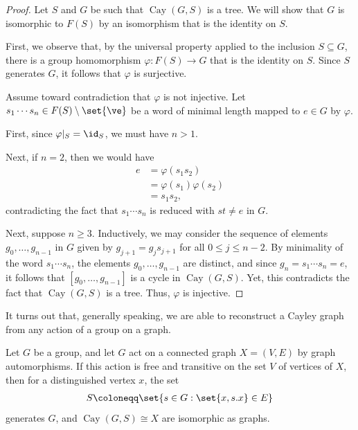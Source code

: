 \documentclass[10pt]{mypackage}
\renewcommand{\coloneq}{\coloneqq}
\begin{document}
\begin{proof}
  Let $S$ and $G$ be such that $\operatorname{Cay}\left( G,S \right)$ is a tree. We will show that $G$ is isomorphic to $F(S)$ by an isomorphism that is the identity on $S$.

  First, we observe that, by the universal property applied to the inclusion $S\subseteq G$, there is a group homomorphism $\varphi\colon F(S)\rightarrow G$ that is the identity on $S$. Since $S$ generates $G$, it follows that $\varphi$ is surjective.

  Assume toward contradiction that $\varphi$ is not injective. Let $s_1\cdots s_n\in F(S)\setminus \set{\ve}$ be a word of minimal length mapped to $e\in G$ by $\varphi$.

  First, since $\varphi|_{S} = \id_S$, we must have $n > 1$.

  Next, if $n = 2$, then we would have
  \begin{align*}
    e &= \varphi\left( s_1s_2 \right)\\
      &= \varphi\left( s_1 \right)\varphi\left( s_2 \right)\\
      &= s_1s_2,
  \end{align*}
  contradicting the fact that $s_1\cdots s_n$ is reduced with $st\neq e$ in $G$.

  Next, suppose $n\geq 3$. Inductively, we may consider the sequence of elements $g_0,\dots,g_{n-1}$ in $G$ given by $g_{j+1} = g_js_{j+1}$ for all $0\leq j \leq n-2$. By minimality of the word $s_1\cdots s_n$, the elements $g_0,\dots,g_{n-1}$ are distinct, and since $g_n = s_1\cdots s_n = e$, it follows that $\left[ g_0,\dots,g_{n-1} \right]$ is a cycle in $\operatorname{Cay}\left( G,S \right)$. Yet, this contradicts the fact that $\operatorname{Cay}\left( G,S \right)$ is a tree. Thus, $\varphi$ is injective.
\end{proof}
It turns out that, generally speaking, we are able to reconstruct a Cayley graph from any action of a group on a graph.
\begin{proposition}
  Let $G$ be a group, and let $G$ act on a connected graph $X = \left( V,E \right)$ by graph automorphisms. If this action is free and transitive on the set $V$ of vertices of $X$, then for a distinguished vertex $x$, the set
  \begin{align*}
    S \coloneq \set{s\in G : \set{x,s.x}\in E}
  \end{align*}
  generates $G$, and $\operatorname{Cay}\left( G,S \right)\cong X$ are isomorphic as graphs.
\end{proposition}
\end{document}
